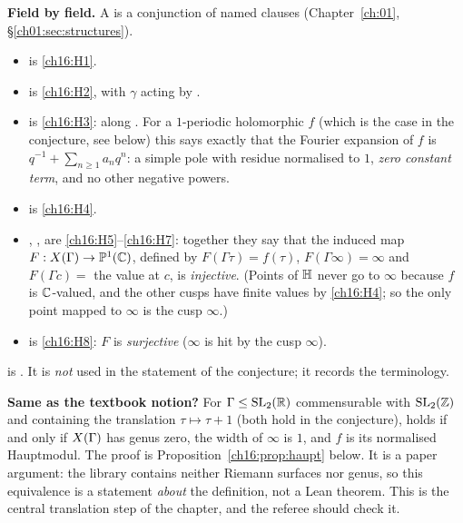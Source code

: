 \begin{dictionary}
\textbf{Field by field.}  A  is a conjunction of named clauses
(Chapter~\ref{ch:01}, \S\ref{ch01:sec:structures}).
\begin{itemize}
\item {} is \ref{ch16:H1}.
\item {} is \ref{ch16:H2}, with $\gamma$ acting by .
\item {} is \ref{ch16:H3}:  along .  For a $1$-periodic
  holomorphic $f$ (which is the case in the conjecture, see below) this says exactly that the Fourier expansion of $f$
  is $q^{-1}+\sum_{n\ge1}a_nq^n$: a simple pole with residue normalised to $1$, \emph{zero constant term}, and no other
  negative powers.
\item {} is \ref{ch16:H4}.
\item {}, ,  are \ref{ch16:H5}--\ref{ch16:H7}:
  together they say that the induced map $F:X(\Gamma)\to\mathbb{P}^1({\mathbb{C}})$, defined by $F(\Gamma\tau)=f(\tau)$,
  $F(\Gamma\infty)=\infty$ and $F(\Gamma c)=$ the value at $c$, is \emph{injective}.  (Points of $\mathbb{H}$ never go
  to $\infty$ because $f$ is ${\mathbb{C}}$-valued, and the other cusps have finite values by \ref{ch16:H4}; so the only point
  mapped to $\infty$ is the cusp $\infty$.)
\item {} is \ref{ch16:H8}: $F$ is \emph{surjective} ($\infty$ is hit by the cusp $\infty$).
\end{itemize}
 is .  It is \emph{not} used in the statement of the
conjecture; it records the terminology.

\textbf{Same as the textbook notion?}  For $\Gamma\le\mathrm{SL}_2(\mathbb{R})$ commensurable with $\mathrm{SL}_2(\mathbb{Z})$ and containing
the translation $\tau\mapsto\tau+1$ (both hold in the conjecture),  holds if and only
if $X(\Gamma)$ has genus zero, the width of $\infty$ is $1$, and $f$ is its normalised Hauptmodul.  The proof is
Proposition~\ref{ch16:prop:haupt} below.  It is a paper argument: the library contains neither Riemann surfaces nor
genus, so this equivalence is a statement \emph{about} the definition, not a Lean theorem.  This is the central
translation step of the chapter, and the referee should check it.


\end{dictionary}
